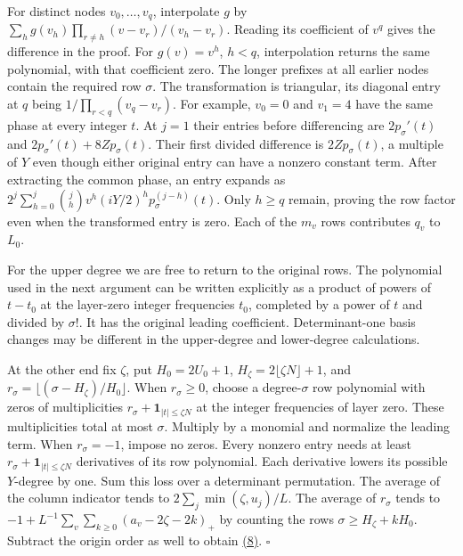 \documentclass[11pt,a4paper]{article}
\begin{document}
For distinct nodes \(v_0,\ldots,v_q\), interpolate \(g\) by \(\sum_h g(v_h)\prod_{r\ne h}(v-v_r)/(v_h-v_r)\). Reading its coefficient of \(v^q\) gives the difference in the proof. For \(g(v)=v^h\), \(h<q\), interpolation returns the same polynomial, with that coefficient zero. The longer prefixes at all earlier nodes contain the required row \(\sigma\). The transformation is triangular, its diagonal entry at \(q\) being \(1/\prod_{r<q}(v_q-v_r)\). For example, \(v_0=0\) and \(v_1=4\) have the same phase at every integer \(t\). At \(j=1\) their entries before differencing are \(2p_\sigma'(t)\) and \(2p_\sigma'(t)+8Zp_\sigma(t)\). Their first divided difference is \(2Zp_\sigma(t)\), a multiple of \(Y\) even though either original entry can have a nonzero constant term. After extracting the common phase, an entry expands as \(2^j\sum_{h=0}^j\binom jh v^h(iY/2)^h p_\sigma^{(j-h)}(t)\). Only \(h\ge q\) remain, proving the row factor even when the transformed entry is zero. Each of the \(m_v\) rows contributes \(q_v\) to \(L_0\).

For the upper degree we are free to return to the original rows. The polynomial used in the next argument can be written explicitly as a product of powers of \(t-t_0\) at the layer-zero integer frequencies \(t_0\), completed by a power of \(t\) and divided by \(\sigma!\). It has the original leading coefficient. Determinant-one basis changes may be different in the upper-degree and lower-degree calculations.

At the other end fix \(\zeta\), put \(H_0=2U_0+1\), \(H_\zeta=2\lfloor\zeta N\rfloor+1\), and \(r_\sigma=\lfloor(\sigma-H_\zeta)/H_0\rfloor\). When \(r_\sigma\ge0\), choose a degree-\(\sigma\) row polynomial with zeros of multiplicities \(r_\sigma+\mathbf1_{|t|\le\zeta N}\) at the integer frequencies of layer zero. These multiplicities total at most \(\sigma\). Multiply by a monomial and normalize the leading term. When \(r_\sigma=-1\), impose no zeros. Every nonzero entry needs at least \(r_\sigma+\mathbf1_{|t|\le\zeta N}\) derivatives of its row polynomial. Each derivative lowers its possible \(Y\)-degree by one. Sum this loss over a determinant permutation. The average of the column indicator tends to \(2\sum_j\min(\zeta,u_j)/L\). The average of \(r_\sigma\) tends to \(-1+L^{-1}\sum_v\sum_{k\ge0}(a_v-2\zeta-2k)_+\) by counting the rows \(\sigma\ge H_\zeta+kH_0\). Subtract the origin order as well to obtain \hyperref[eq:8]{(8)}. \(\square\)
\end{document}
